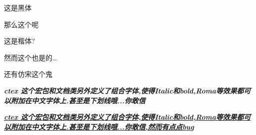 \documentclass[UTF8]{ctexart}
\begin{document}
{ 这是黑体}

那么这个呢

这是楷体?

然而这个也是的\ldots

还有仿宋这个鬼

{
\itshape
\bfseries
ctex 这个宏包和文档类另外定义了组合字体,使得Italic和bold,Roma等效果都可以附加在中文字体上.甚至是下划线哦...你敢信
}

\underline
{
	\itshape
	\bfseries
	ctex 这个宏包和文档类另外定义了组合字体,使得Italic和bold,Roma等效果都可以附加在中文字体上.甚至是下划线哦...你敢信,然而有点点bug
}
\end{document}
